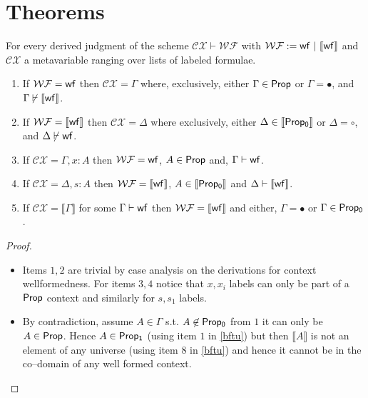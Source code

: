 \section{Theorems}
\begin{proposition} 
\label{bfcw}
For every derived  judgment of the scheme $\mathcal{ CX}\vdash\mathcal{ WF}$ with $\mathcal{WF}:= {\sf wf}\  |\  {\sf \llbracket  wf \rrbracket }$ and $\mathcal{ CX}$ a metavariable ranging over lists of labeled formulae.
\begin{enumerate}
\item If $ \mathcal{ WF}= {\sf wf}$ then $\mathcal{CX}=\Gamma$ where, exclusively, either $\Gamma\in {\sf Prop}$ or $\Gamma=\bullet$, and $\Gamma\centernot\vdash \llbracket {\sf wf}\rrbracket$.
\item If $ \mathcal{ WF}= {\sf\llbracket wf\rrbracket}$ then $\mathcal{CX}=\Delta$ where exclusively, either $\Delta\in {\sf \llbracket Prop_0\rrbracket}$ or $\Delta = \circ$,  and $\Delta\centernot\vdash {\sf wf}$.
\item If $\mathcal{CX}= \Gamma, x:A$ then $ \mathcal{ WF}= {\sf wf}$, $A\in {\sf Prop}$ and,  $\Gamma\vdash {\sf wf}$.
\item If $\mathcal{CX}= \Delta, s:A $ then $ \mathcal{ WF}= { \llbracket {\sf wf} \rrbracket}$, $A\in { \llbracket {\sf Prop_0}\rrbracket}$  and $\Delta\vdash{ \llbracket {\sf wf}\rrbracket}$.
\item If $\mathcal{CX}=\llbracket \Gamma \rrbracket$ for some $\Gamma\vdash{\sf wf}$ then  $\mathcal{ WF}={\llbracket {\sf wf}\rrbracket}$ and either, $\Gamma = \bullet$ or $\Gamma \in {\sf Prop_0}$.
\end{enumerate}
\end{proposition}
\begin{proof}
\begin{itemize}

\item
Items $1,2$ are trivial by case analysis on the derivations for context wellformedness. For items $3,4$ notice that $x,x_i$ labels can only be part of a ${\sf Prop}$ context and similarly for $s,s_1$ labels.
\item
By contradiction, assume $A\in\Gamma$ s.t. $A\not\in {\sf Prop_0}$ from $1$ it can only be $A\in {\sf Prop}$.
Hence $A\in {\sf Prop_1}$ (using item $1$ in \ref{bftu}) but then $\llbracket A \rrbracket$ is not an element of any universe (using item $8$ in \ref{bftu}) and hence it cannot be in the co--domain of any well formed context.
\end{itemize}
\end{proof}
